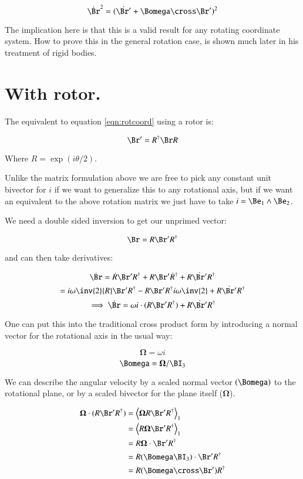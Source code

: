 \documentclass{article}      %
\newcommand{\dt}[1]{\dot{#1}}
\newcommand{\gpgradeone}[1] {{\left\langle{{#1}}\right\rangle}_{1}}
\newcommand{\BOmega}[0]{\boldsymbol{\Omega}}
\begin{document}
\[
\dt{\Br}^2 = ( \dt{\Br'} + \Bomega \cross \Br')^2
\]

The implication here is that this is a valid result for any rotating
coordinate system.   How to prove this in the general rotation case, is shown much later
in his treatment of rigid bodies.

\section{ With rotor. }

The equivalent to equation \ref{eqn:rotcoord} using a rotor is:

\begin{equation}
\Br' = R^\dagger \Br R
\end{equation}

Where $R = \exp( i\theta/2 )$.

Unlike the 
matrix formulation above we are free to pick any constant unit bivector
for $i$ if we want to generalize this to any rotational axis, but if we
want an equivalent to the above rotation matrix we just have to take
$i = \Be_1 \wedge \Be_2$.

We need a double sided inversion to get our unprimed vector:

\[
\Br = R \Br' R^\dagger
\]

and can then take derivatives:

\[
\dt{\Br} = 
\dt{R} \Br' R^\dagger
+{R} {\Br'} \dt{R}^\dagger
+{R} \dt{\Br'} R^\dagger
\]
\[
= 
i\omega \inv{2} {R} \Br' R^\dagger
- {R} \Br' R^\dagger i\omega\inv{2}
+{R} \dt{\Br'} R^\dagger
\]
\begin{equation}\label{eqn:velocityfixedrotplane}
\implies
\dt{\Br} = \omega i \cdot ({R} \Br' R^\dagger) +  {R} \dt{\Br'} R^\dagger
\end{equation}

One can put this into the traditional cross product form by introducing
a normal vector for the rotational axis in the usual way:

\[
\BOmega = \omega i
\]
\[
\Bomega = \BOmega / \BI_3
\]

We can describe the angular velocity by a scaled normal vector $(\Bomega)$ to the rotational plane, or by a scaled bivector for the plane itself ($\BOmega$).

\begin{align*}
\BOmega \cdot ({R} \Br' R^\dagger)
&= \gpgradeone{ \BOmega {R} \Br' R^\dagger } \\
&= \gpgradeone{ {R} \BOmega \Br' R^\dagger } \\
&= {R} \BOmega \cdot \Br' R^\dagger \\
&= {R} (\Bomega \BI_3) \cdot \Br' R^\dagger \\
&= {R} (\Bomega \cross \Br') R^\dagger \\
\end{align*}
\end{document}
